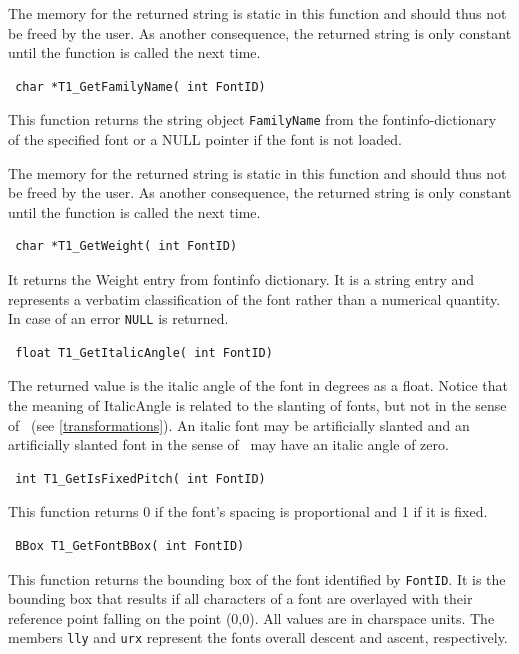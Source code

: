 The memory for the returned string is static in this function and should thus
not be freed by the user. As another consequence, the returned
string is only constant until the function is called the next time.

\precorr
\begin{verbatim}
 char *T1_GetFamilyName( int FontID)
\end{verbatim}\postcorr
This function returns the string object \verb+FamilyName+ from the
fontinfo-dictionary of the specified font or a NULL pointer if the font is not
loaded.

The memory for the returned string is static in this function and should thus
not be freed by the user. As another consequence, the returned
string is only constant until the function is called the next time.

\precorr
\begin{verbatim}
 char *T1_GetWeight( int FontID)
\end{verbatim}\postcorr
It returns the Weight entry from fontinfo dictionary. It is a string
entry and represents a verbatim classification of the font rather than
a numerical quantity. In case of an error \verb+NULL+ is returned.

\precorr
\begin{verbatim}
 float T1_GetItalicAngle( int FontID)
\end{verbatim}\postcorr
The returned value is the italic angle of the font in degrees as a
float. Notice that the meaning of ItalicAngle is related to the slanting
of fonts, but not in the sense of \tonelib\ (see
\ref{transformations}). 
An italic font may be artificially slanted and an artificially slanted
font in the sense of \tonelib\ may have an italic angle of zero. 

\precorr
\begin{verbatim}
 int T1_GetIsFixedPitch( int FontID)
\end{verbatim}\postcorr
This function returns 0 if the font's spacing is proportional and 1 if
it is fixed. 

\precorr
\begin{verbatim}
 BBox T1_GetFontBBox( int FontID)
\end{verbatim}\postcorr
This function returns the bounding box of the font identified by
\verb+FontID+. It is the bounding box that 
results if all characters of a font are overlayed with their reference point
falling on the point (0,0). All values are in charspace units. The members
\verb+lly+ and \verb+urx+ represent the fonts overall descent and ascent,
respectively. 

